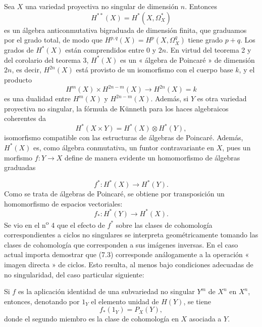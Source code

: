 
Sea $X$ una variedad proyectiva no singular de dimensión $n$. Entonces
\[
  H^{**}(X)=H^{*}(X,\Omega_X^{*})
\]
es un álgebra anticonmutativa bigraduada de dimensión finita, que graduamos
por el grado total, de modo que $H^{p,q}(X)=H^{p}(X,\Omega_X^{q})$ tiene grado
$p+q$. Los grados de $H^{*}(X)$ están comprendidos entre $0$ y $2n$. En virtud del
teorema 2 y del corolario del teorema 3, $H^{*}(X)$ es un « álgebra de
Poincaré » de dimensión $2n$, es decir, $H^{2n}(X)$ está provisto de un isomorfismo con
el cuerpo base $k$, y el producto
\[
  H^{m}(X)\times H^{2n-m}(X)\longrightarrow H^{2n}(X)=k
\]
es una dualidad entre $H^{m}(X)$ y $H^{2n-m}(X)$. Además, si $Y$ es otra
variedad proyectiva no singular, la fórmula de Künneth para los
haces algebraicos coherentes da
\begin{equation}\tag{7.1}
  H^{*}(X\times Y)=H^{*}(X)\otimes H^{*}(Y),
\end{equation}
isomorfismo compatible con las estructuras de álgebras de Poincaré. Además,
$H^{*}(X)$ es, como álgebra conmutativa, un funtor contravariante en
$X$, pues un morfismo $f:Y\longrightarrow X$ define de manera evidente un
homomorfismo de álgebras graduadas

\begin{equation}\tag{7.2}
  f^{*}:H^{*}(X)\longrightarrow H^{*}(Y).
\end{equation}
Como se trata de álgebras de Poincaré, se obtiene por transposición un
homomorfismo de espacios vectoriales:
\begin{equation}\tag{7.3}
  f_{*}:H^{*}(Y)\longrightarrow H^{*}(X).
\end{equation}
Se vio en el n\textsuperscript{o} 4 que el efecto de $f^{*}$ sobre las clases de
cohomología correspondientes a ciclos no singulares se interpreta
geométricamente tomando las clases de cohomología que corresponden a sus
imágenes inversas. En el caso actual importa demostrar que (7.3) corresponde
análogamente a la operación « imagen directa » de ciclos. Esto resulta, al menos bajo
condiciones adecuadas de no singularidad, del caso particular siguiente:

 Si $f$ es la aplicación identidad de una subvariedad no
singular $Y^{m}$ de $X^{n}$ en $X^{n}$, entonces, denotando por $1_Y$
el elemento unidad de $H(Y)$, se tiene
\begin{equation}\tag{7.4}
  f_{*}(1_Y)=P_X(Y),
\end{equation}
donde el segundo miembro es la clase de cohomología en $X$ asociada a $Y$.

